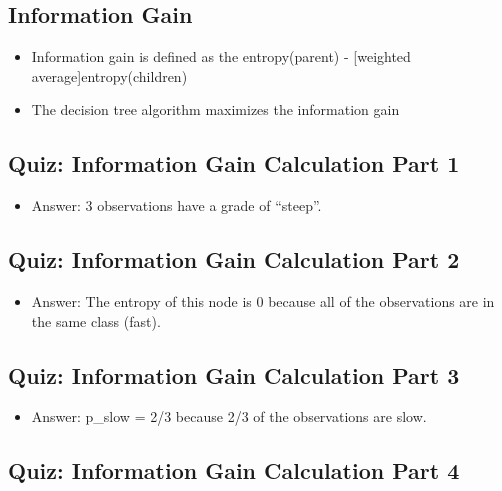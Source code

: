 \documentclass[12pt]{report}
\begin{document}
\subsection{Information Gain}

\begin{itemize}

\item Information gain is defined as the entropy(parent) - [weighted average]entropy(children)

\item The decision tree algorithm maximizes the information gain

\end{itemize}

\subsection{Quiz: Information Gain Calculation Part 1}

\begin{itemize}

\item Answer: 3 observations have a grade of ``steep''. 

\end{itemize}

\subsection{Quiz: Information Gain Calculation Part 2}

\begin{itemize}

\item Answer: The entropy of this node is 0 because all of the observations are in the same class (fast). 

\end{itemize}

\subsection{Quiz: Information Gain Calculation Part 3}

\begin{itemize}

\item Answer: p\_slow = 2/3 because 2/3 of the observations are slow. 

\end{itemize}

\subsection{Quiz: Information Gain Calculation Part 4}
\end{document}
